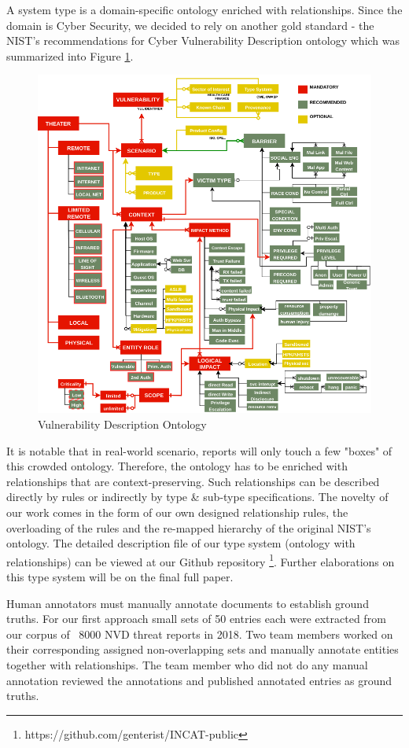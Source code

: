 \documentclass{article} %
\begin{document}
A system type is a domain-specific ontology enriched with relationships. Since the domain is Cyber Security, we decided to rely on another gold standard - the NIST's recommendations for Cyber Vulnerability Description ontology \cite{Booth2016DraftOntology} which was summarized into Figure \ref{Figure:VulOntology}.

\begin{figure}[h]
  \centering
  \includegraphics[width=12cm]{images/NISTIR8138.png}
  \caption{Vulnerability Description Ontology}
  \label{Figure:VulOntology}
\end{figure}

It is notable that in real-world scenario, reports will only touch a few "boxes" of this crowded ontology. Therefore, the ontology has to be enriched with relationships that are context-preserving. Such relationships can be described directly by rules or indirectly by type \& sub-type specifications. The novelty of our work comes in the form of our own designed relationship rules, the overloading of the rules and the re-mapped hierarchy of the original NIST's ontology. The detailed description file of our type system (ontology with relationships) can be viewed at our Github repository \footnote{https://github.com/genterist/INCAT-public}. Further elaborations on this type system will be on the final full paper.

Human annotators must manually annotate documents to establish ground truths.  For our first approach small sets of 50 entries each were extracted from our corpus of ~8000 NVD threat reports in 2018.  Two team members worked on their corresponding assigned non-overlapping sets and manually annotate entities together with relationships. The team member who did not do any manual annotation reviewed the annotations and published annotated entries as ground truths.  
\end{document}

